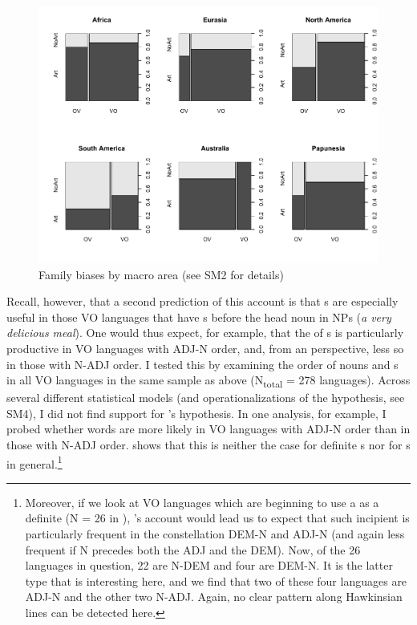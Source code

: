 \documentclass[output=paper]{langsci/langscibook}
\begin{document}
 
\begin{figure}
\includegraphics[width=\textwidth]{figures/ksb3.pdf}
\caption{Family biases by macro area (see SM2 for details)}
\label{fig:ksb:3}
\end{figure}
\newpage

Recall, however, that a second prediction of this account is that s are especially useful in those VO languages that have s before the head noun in NPs (\textit{a very delicious meal}). One would thus expect, for example, that the  of s is particularly productive in VO languages with ADJ-N order, and, from an  perspective, less so in those with N-ADJ order. I tested this by examining the order of nouns and s \citep{Dryer2013_Adj} in all VO languages in the same sample as above (N\textsubscript{total} = 278 languages). \newpage Across several different statistical models (and operationalizations of the hypothesis, see SM4), I did not find support for ’s  hypothesis. In one analysis, for example, I probed whether  words are more likely in VO languages with ADJ-N order than in those with N-ADJ order.  shows that this is neither the case for definite s nor for s in general.\footnote{Moreover, if we look at VO languages which are beginning to use a  as a definite  (N = 26 in \citealt{Dryer2013_Def}), ’s account would lead us to expect that such incipient  is particularly frequent in the constellation DEM-N and ADJ-N (and again less frequent if N precedes both the ADJ and the DEM). Now, of the 26 languages in question, 22 are N-DEM and four are DEM-N. It is the latter type that is interesting here, and we find that two of these four languages are ADJ-N and the other two N-ADJ. Again, no clear pattern along Hawkinsian lines can be detected here.} 
\end{document}
